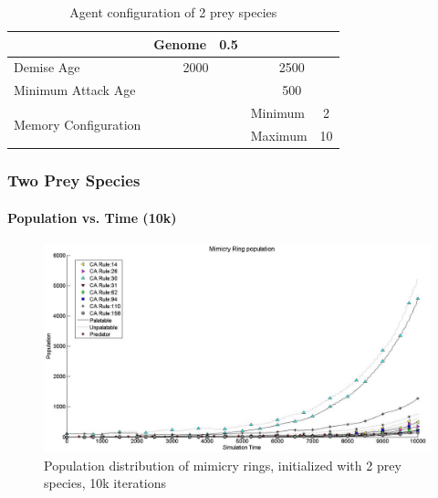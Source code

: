 {\begin{table}
\begin{tiny}
\begin{spacing}{1.5}
\begin{tabular}{|l|l|c|c|l|c|}
	  						 									 & Genome    & \multicolumn{2}{|c|}{0.5}  & \multicolumn{2}{|c|}{} \\ \hline
	  Demise Age	 									 & \multicolumn{3}{|c|}{2000}							& \multicolumn{2}{|c|}{2500} \\ \hline
	  Minimum Attack Age						 & \multicolumn{3}{|c|}{} 						    & \multicolumn{2}{|c|}{500} \\ \hline
	  \multirow{2}{*}{Memory Configuration} & \multicolumn{3}{|c|}{} 					& Minimum & 2 \\ \cline{5-6}
	   																			& \multicolumn{3}{|c|}{} 					& Maximum & 10 \\ \hline  
	\end{tabular}
	\end{spacing}
	\end{tiny}
	\caption{Agent configuration of 2 prey species}
	\label{tab:config-table-2-prey}
	\end{table}
}

\frame
{
	\frametitle{Two Prey Species}
	\framesubtitle{Population vs. Time (10k)}
	
	\begin{figure}
		\centering
		\includegraphics[scale=0.25]{../tex/images/simTime10k-2Prey}
		\caption{Population distribution of mimicry rings, initialized with 2 prey species, 10k iterations}
		\label{fig:plot-2-prey}
	\end{figure}
}

